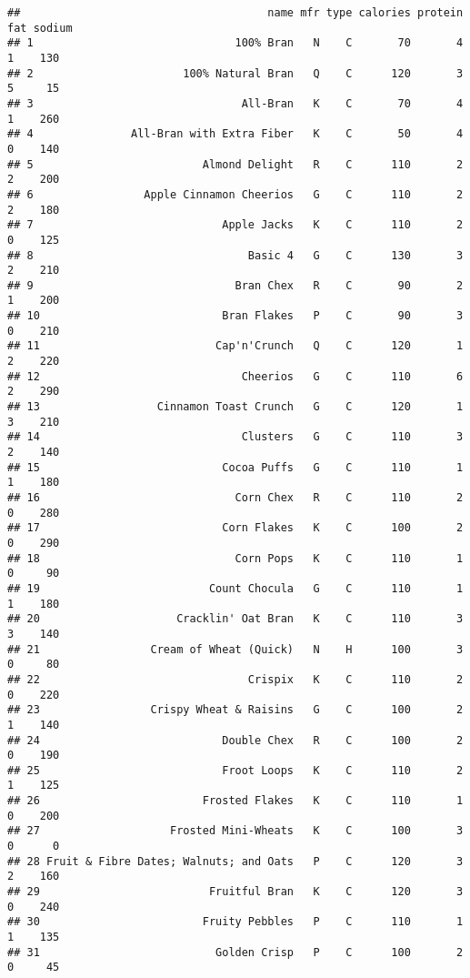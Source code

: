 \documentclass[
]{article}
\begin{document}
\begin{verbatim}
##                                      name mfr type calories protein fat sodium
## 1                               100% Bran   N    C       70       4   1    130
## 2                       100% Natural Bran   Q    C      120       3   5     15
## 3                                All-Bran   K    C       70       4   1    260
## 4               All-Bran with Extra Fiber   K    C       50       4   0    140
## 5                          Almond Delight   R    C      110       2   2    200
## 6                 Apple Cinnamon Cheerios   G    C      110       2   2    180
## 7                             Apple Jacks   K    C      110       2   0    125
## 8                                 Basic 4   G    C      130       3   2    210
## 9                               Bran Chex   R    C       90       2   1    200
## 10                            Bran Flakes   P    C       90       3   0    210
## 11                           Cap'n'Crunch   Q    C      120       1   2    220
## 12                               Cheerios   G    C      110       6   2    290
## 13                  Cinnamon Toast Crunch   G    C      120       1   3    210
## 14                               Clusters   G    C      110       3   2    140
## 15                            Cocoa Puffs   G    C      110       1   1    180
## 16                              Corn Chex   R    C      110       2   0    280
## 17                            Corn Flakes   K    C      100       2   0    290
## 18                              Corn Pops   K    C      110       1   0     90
## 19                          Count Chocula   G    C      110       1   1    180
## 20                     Cracklin' Oat Bran   K    C      110       3   3    140
## 21                 Cream of Wheat (Quick)   N    H      100       3   0     80
## 22                                Crispix   K    C      110       2   0    220
## 23                 Crispy Wheat & Raisins   G    C      100       2   1    140
## 24                            Double Chex   R    C      100       2   0    190
## 25                            Froot Loops   K    C      110       2   1    125
## 26                         Frosted Flakes   K    C      110       1   0    200
## 27                    Frosted Mini-Wheats   K    C      100       3   0      0
## 28 Fruit & Fibre Dates; Walnuts; and Oats   P    C      120       3   2    160
## 29                          Fruitful Bran   K    C      120       3   0    240
## 30                         Fruity Pebbles   P    C      110       1   1    135
## 31                           Golden Crisp   P    C      100       2   0     45

\end{verbatim}
\end{document}
